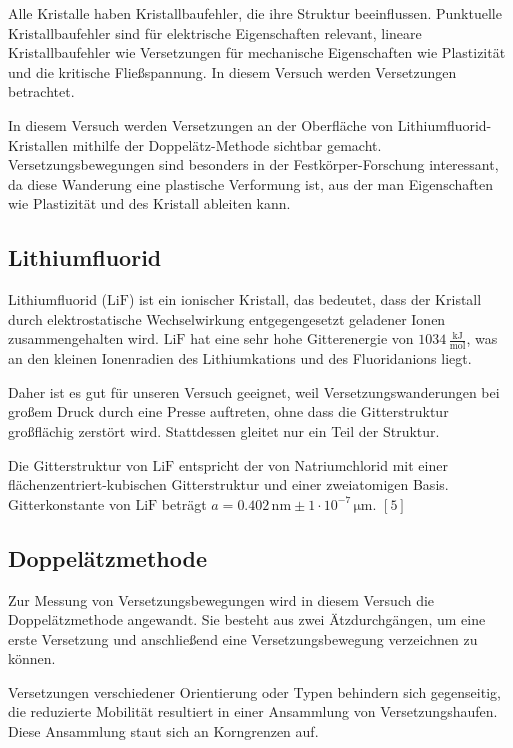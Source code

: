 \documentclass[12pt,a4paper]{scrartcl}
\numberwithin{equation}{section} %
\renewcommand{\[}{} %
\renewcommand{\]}{\noindent} %
\begin{document}
Alle Kristalle haben Kristallbaufehler, die ihre Struktur beeinflussen.
Punktuelle Kristallbaufehler sind für elektrische Eigenschaften
relevant, lineare Kristallbaufehler wie Versetzungen für mechanische
Eigenschaften wie Plastizität und die kritische Fließspannung. In diesem
Versuch werden Versetzungen betrachtet.

In diesem Versuch werden Versetzungen an der Oberfläche von
Lithiumfluorid-Kristallen mithilfe der Doppelätz-Methode sichtbar
gemacht. Versetzungsbewegungen sind besonders in der
Festkörper-Forschung interessant, da diese Wanderung eine plastische
Verformung ist, aus der man Eigenschaften wie Plastizität und des
Kristall ableiten kann.

\hypertarget{lithiumfluorid}{%
\subsection{Lithiumfluorid}\label{lithiumfluorid}}

Lithiumfluorid (\(\mathrm{LiF}\)) ist ein ionischer Kristall, das
bedeutet, dass der Kristall durch elektrostatische Wechselwirkung
entgegengesetzt geladener Ionen zusammengehalten wird. \(\mathrm{LiF}\)
hat eine sehr hohe Gitterenergie von \(1034\mathrm{\,\frac{kJ}{mol}}\),
was an den kleinen Ionenradien des Lithiumkations und des Fluoridanions
liegt.

Daher ist es gut für unseren Versuch geeignet, weil
Versetzungswanderungen bei großem Druck durch eine Presse auftreten,
ohne dass die Gitterstruktur großflächig zerstört wird. Stattdessen
gleitet nur ein Teil der Struktur.

Die Gitterstruktur von \(\mathrm{LiF}\) entspricht der von
Natriumchlorid mit einer flächenzentriert-kubischen Gitterstruktur und
einer zweiatomigen Basis. Gitterkonstante von \(\mathrm{LiF}\) beträgt
\(a=0.402\mathrm{\,nm}\pm 1 \cdot 10^{-7} \mathrm{\, \mu m}\). \([5]\)

\hypertarget{doppeluxe4tzmethode}{%
\subsection{Doppelätzmethode}\label{doppeluxe4tzmethode}}

Zur Messung von Versetzungsbewegungen wird in diesem Versuch die
Doppelätzmethode angewandt. Sie besteht aus zwei Ätzdurchgängen, um eine
erste Versetzung und anschließend eine Versetzungsbewegung verzeichnen
zu können.

Versetzungen verschiedener Orientierung oder Typen behindern sich
gegenseitig, die reduzierte Mobilität resultiert in einer Ansammlung von
Versetzungshaufen. Diese Ansammlung staut sich an Korngrenzen auf.
\end{document}
